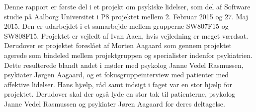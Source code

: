 Denne rapport er første del i et projekt om psykiske lidelser, som del af Software studie på Aalborg Universitet i P8 projektet mellem 2. Februar 2015 og 27. Maj 2015. 
Den er udarbejdet i et samarbejde mellem grupperne SW807F15 og SW808F15.
Projektet er vejledt af Ivan Aaen, hvis vejledning er meget værdsat.
Derudover er projektet foreslået af Morten Aagaard som gennem projektet agerede som bindeled mellem projektgruppen og specialister indenfor psykiatrien. Dette resulterede blandt andet i møder med psykolog Janne Vedel Rasmussen, psykiater Jørgen Aagaard, og et fokusgruppeinterview med patienter med affektive lidelser. Hans hjælp, råd samt indsigt i faget var en stor hjælp for projektet.
Derudover skal der også lyde en stor tak til patienterne, psykolog Janne Vedel Rasmussen og psykiater Jøren Aagaard for deres deltagelse.